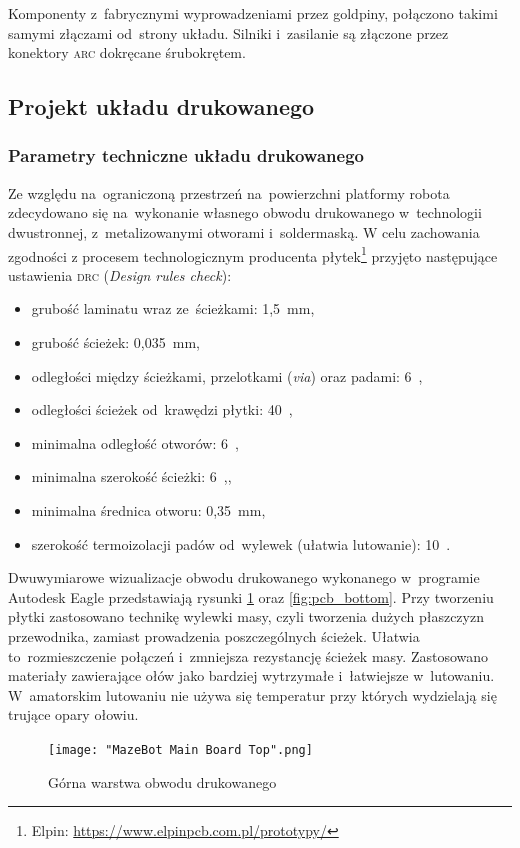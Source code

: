 \documentclass[11pt]{article}
\begin{document}
Komponenty z~fabrycznymi wyprowadzeniami przez goldpiny, połączono takimi samymi złączami od~strony układu.
Silniki i~zasilanie są złączone przez konektory \textsc{arc} dokręcane śrubokrętem.

\subsection{Projekt układu drukowanego}
\subsubsection{Parametry techniczne układu drukowanego}
Ze względu na~ograniczoną przestrzeń na~powierzchni platformy robota zdecydowano się na~wykonanie własnego obwodu drukowanego w~technologii dwustronnej, z~metalizowanymi otworami i~soldermaską.
W celu zachowania zgodności z procesem technologicznym producenta płytek\footnote{Elpin: \url{https://www.elpinpcb.com.pl/prototypy/}}
przyjęto następujące ustawienia \textsc{drc} (\textit{Design rules check}):
\begin{itemize}
	\item grubość laminatu wraz ze~ścieżkami: 1,5~\si{\milli\meter},
	\item grubość ścieżek: 0,035~\si{\milli\meter},
	\item odległości między ścieżkami, przelotkami (\textit{via}) oraz padami: 6~\si{\mil},
	\item odległości ścieżek od~krawędzi płytki: 40~\si{\mil},
	\item minimalna odległość otworów: 6~\si{\mil},
	\item minimalna szerokość ścieżki: 6~\si{\mil},,
	\item minimalna średnica otworu: 0,35~\si{\milli\meter},
	\item szerokość termoizolacji padów od~wylewek (ułatwia lutowanie): 10~\si{\mil}.
\end{itemize}
Dwuwymiarowe wizualizacje obwodu drukowanego wykonanego w~programie Autodesk Eagle przedstawiają rysunki \ref{fig:pcb_top} oraz \ref{fig:pcb_bottom}.
Przy tworzeniu płytki zastosowano technikę wylewki masy, czyli tworzenia dużych płaszczyzn przewodnika, zamiast prowadzenia poszczególnych ścieżek.
Ułatwia to~rozmieszczenie połączeń i~zmniejsza rezystancję ścieżek masy.
Zastosowano materiały zawierające ołów jako bardziej wytrzymałe i~łatwiejsze w~lutowaniu.
W~amatorskim lutowaniu nie używa się temperatur przy których wydzielają się trujące opary ołowiu.

\begin{figure}[!htbp]
	\centering
	\texttt{[image: "MazeBot Main Board Top".png]}
	\caption{Górna warstwa obwodu drukowanego}
	\label{fig:pcb_top}
\end{figure}
\end{document}
